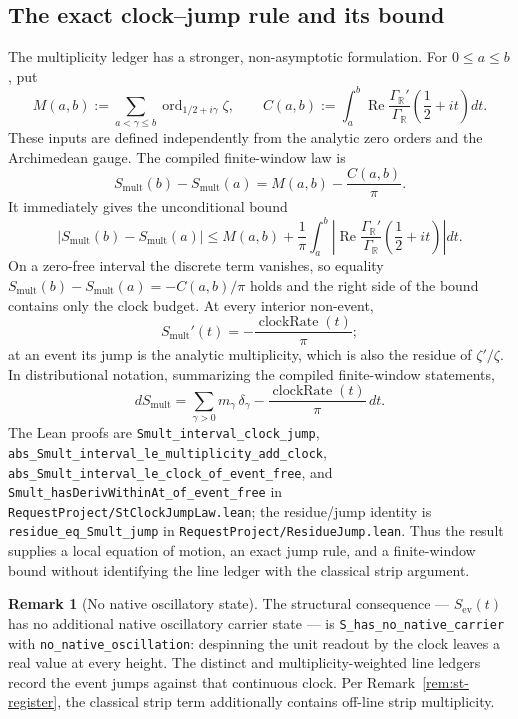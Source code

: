 \documentclass[11pt]{article}
\theoremstyle{definition}
\newtheorem{remark}[theorem]{Remark}
\renewcommand{\Re}{\operatorname{Re}}
\begin{document}
\subsection{The exact clock--jump rule and its bound}
The multiplicity ledger has a stronger, non-asymptotic formulation.  For
\(0\le a\le b\), put
\[
 M(a,b):=\sum_{a<\gamma\le b}
 \operatorname{ord}_{1/2+i\gamma}\zeta ,
 \qquad
 C(a,b):=\int_a^b
 \Re\frac{\Gamma_{\mathbb R}'}{\Gamma_{\mathbb R}}
       \!\left(\frac12+it\right)dt .
\]
These inputs are defined independently from the analytic zero orders and the
Archimedean gauge.  The compiled finite-window law is
\begin{equation}\label{eq:st-clock-jump}
\boxed{
 S_{\mathrm{mult}}(b)-S_{\mathrm{mult}}(a)
 =M(a,b)-\frac{C(a,b)}{\pi}.}
\end{equation}
It immediately gives the unconditional bound
\begin{equation}\label{eq:st-clock-jump-bound}
\boxed{
 \left|S_{\mathrm{mult}}(b)-S_{\mathrm{mult}}(a)\right|
 \le M(a,b)+\frac1\pi\int_a^b
 \left|\Re\frac{\Gamma_{\mathbb R}'}{\Gamma_{\mathbb R}}
       \!\left(\frac12+it\right)\right|dt.}
\end{equation}
On a zero-free interval the discrete term vanishes, so equality
\(S_{\mathrm{mult}}(b)-S_{\mathrm{mult}}(a)=-C(a,b)/\pi\) holds and the
right side of the bound contains only the clock budget.  At every interior
non-event,
\[
 S_{\mathrm{mult}}'(t)=-\frac{\operatorname{clockRate}(t)}{\pi};
\]
at an event its jump is the analytic multiplicity, which is also the residue
of \(\zeta'/\zeta\).  In distributional notation, summarizing the compiled
finite-window statements,
\[
 dS_{\mathrm{mult}}
 =\sum_{\gamma>0}m_\gamma\,\delta_\gamma
  -\frac{\operatorname{clockRate}(t)}{\pi}\,dt.
\]
The Lean proofs are
\texttt{Smult\_interval\_clock\_jump},
\texttt{abs\_Smult\_interval\_le\_multiplicity\_add\_clock},
\texttt{abs\_Smult\_interval\_le\_clock\_of\_event\_free}, and
\texttt{Smult\_hasDerivWithinAt\_of\_event\_free} in
\texttt{RequestProject/StClockJumpLaw.lean}; the residue/jump identity is
\texttt{residue\_eq\_Smult\_jump} in
\texttt{RequestProject/ResidueJump.lean}.  Thus the result supplies a local
equation of motion, an exact jump rule, and a finite-window bound without
identifying the line ledger with the classical strip argument.

\begin{remark}[No native oscillatory state]
The structural consequence --- \(S_{\mathrm{ev}}(t)\) has no additional native
oscillatory carrier
state --- is \texttt{S\_has\_no\_native\_carrier} with
\texttt{no\_native\_oscillation}: despinning the unit readout by the clock
leaves a real value at every height.  The distinct and multiplicity-weighted
line ledgers record the event jumps against that continuous clock.  Per
Remark~\ref{rem:st-register}, the classical strip term additionally contains
off-line strip multiplicity.
\end{remark}
\end{document}
